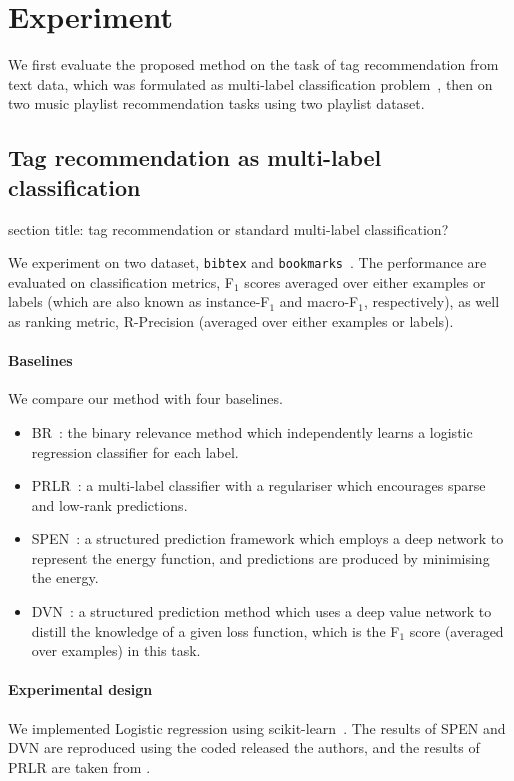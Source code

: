 \clearpage
\newpage

\section{Experiment}
\label{sec:experiment}

We first evaluate the proposed method on the task of tag recommendation from text data,
which was formulated as multi-label classification problem~\cite{katakis2008multilabel},
then on two music playlist recommendation tasks using two playlist dataset.


\subsection{Tag recommendation as multi-label classification}
\label{ssec:mlc}
\TODO section title: tag recommendation or standard multi-label classification?

We experiment on two dataset, \texttt{bibtex} and \texttt{bookmarks}~\cite{katakis2008multilabel}.
The performance are evaluated on classification metrics, \ie F$_1$ scores averaged over either examples or labels 
(which are also known as instance-F$_1$ and macro-F$_1$, respectively),
as well as ranking metric, \ie R-Precision (averaged over either examples or labels).

\paragraph{Baselines}
We compare our method with four baselines.
\begin{itemize}
\item BR~\cite{tsoumakas2006multi}: the binary relevance method which independently learns a logistic regression classifier for each label.
\item PRLR~\cite{lin2014multi}: a multi-label classifier with a regulariser which encourages sparse and low-rank predictions.
\item SPEN~\cite{belanger2016structured}: a structured prediction framework which employs a deep network to represent the energy function,
      and predictions are produced by minimising the energy.
\item DVN~\cite{gygli2017deep}: a structured prediction method which uses a deep value network to distill the knowledge of a given loss function,
      which is the F$_1$ score (averaged over examples) in this task.
\end{itemize}

\paragraph{Experimental design}
We implemented Logistic regression using scikit-learn~\cite{scikit-learn}.
The results of SPEN and DVN are reproduced using the coded released the authors,
and the results of PRLR are taken from \cite{lin2014multi}.

